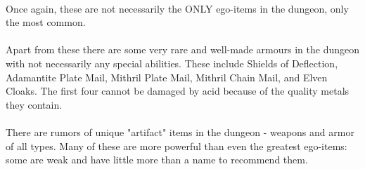 \paragraph{}
Once again, these are not necessarily the ONLY ego-items in the dungeon,
only the most common.

\paragraph{}
Apart from these there are some very rare and well-made armours in the
dungeon with not necessarily any special abilities. These include Shields of
Deflection, Adamantite Plate Mail, Mithril Plate Mail, Mithril Chain Mail,
and Elven Cloaks. The first four cannot be damaged by acid because of the
quality metals they contain.

\paragraph{}
There are rumors of unique "artifact" items in the dungeon - weapons and
armor of all types. Many of these are more powerful than even the greatest
ego-items: some are weak and have little more than a name to recommend them. 

